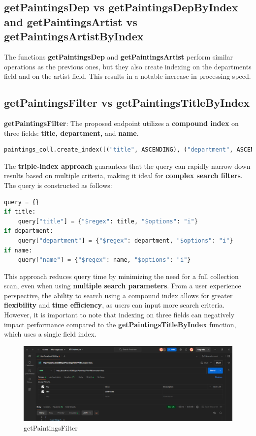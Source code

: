 \documentclass[a4paper,12pt]{article}
\begin{document}
\subsection{getPaintingsDep vs getPaintingsDepByIndex and getPaintingsArtist vs getPaintingsArtistByIndex}

The functions \textbf{getPaintingsDep} and \textbf{getPaintingsArtist} perform similar operations as the previous ones, but they also create indexing on the departments field and on the artist field. This results in a notable increase in processing speed.

\subsection{getPaintingsFilter vs getPaintingsTitleByIndex}
\textbf{getPaintingsFilter}: The proposed endpoint utilizes a \textbf{compound index} on three fields: \textbf{title, department,} and \textbf{name}.
\begin{lstlisting}[language=Python]
paintings_coll.create_index([("title", ASCENDING), ("department", ASCENDING), ("name", ASCENDING)], name="triple_index")
\end{lstlisting}
The \textbf{triple-index approach} guarantees that the query can rapidly narrow down results based on multiple criteria, making it ideal for \textbf{complex search filters}. The query is constructed as follows:
\begin{lstlisting}[language=Python]
query = {}
if title:
    query["title"] = {"$regex": title, "$options": "i"}
if department:
    query["department"] = {"$regex": department, "$options": "i"}
if name:
    query["name"] = {"$regex": name, "$options": "i"}
\end{lstlisting}
This approach reduces query time by minimizing the need for a full collection scan, even when using \textbf{multiple search parameters}. From a user experience perspective, the ability to search using a compound index allows for greater \textbf{flexibility} and \textbf{time efficiency}, as users can input more search criteria. However, it is important to note that indexing on three fields can negatively impact performance compared to the \textbf{getPaintingsTitleByIndex} function, which uses a single field index.

\begin{figure}[h]
      \centering
      \includegraphics[width=1\textwidth]{images/getPaintingsFilterS.png}
      \caption{getPaintingsFilter}
\end{figure}
\end{document}
